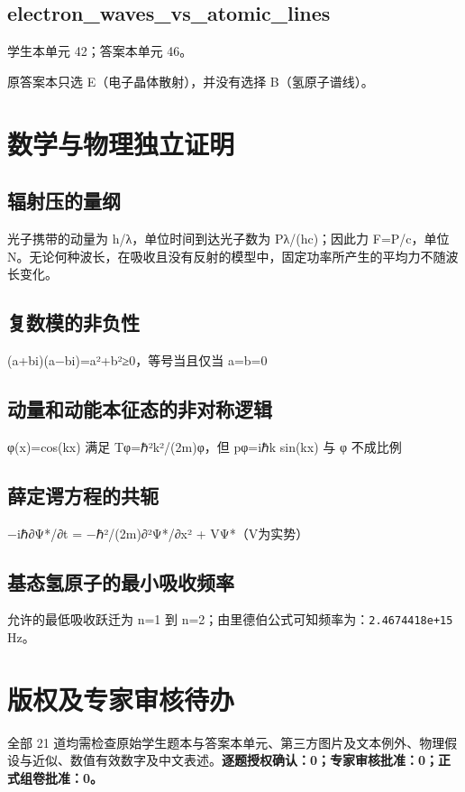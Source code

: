 \documentclass[UTF8,11pt,oneside,openany,fontset=none]{ctexbook}
\begin{document}
\section{electron\_waves\_vs\_atomic\_lines}
\noindent 学生本单元 42；答案本单元 46。\par
\noindent 原答案本只选 E（电子晶体散射），并没有选择 B（氢原子谱线）。\par
\chapter{数学与物理独立证明}
\section{辐射压的量纲}
光子携带的动量为 h/λ，单位时间到达光子数为 Pλ/(hc)；因此力 F=P/c，单位 N。无论何种波长，在吸收且没有反射的模型中，固定功率所产生的平均力不随波长变化。
\section{复数模的非负性}
(a+bi)(a−bi)=a²+b²≥0，等号当且仅当 a=b=0
\section{动量和动能本征态的非对称逻辑}
φ(x)=cos(kx) 满足 Tφ=ℏ²k²/(2m)φ，但 pφ=iℏk sin(kx) 与 φ 不成比例
\section{薛定谔方程的共轭}
−iℏ∂Ψ*/∂t = −ℏ²/(2m)∂²Ψ*/∂x² + VΨ*（V为实势）
\section{基态氢原子的最小吸收频率}
允许的最低吸收跃迁为 n=1 到 n=2；由里德伯公式可知频率为：\texttt{2.4674418e+15} Hz。
\backmatter
\chapter*{版权及专家审核待办}
全部 21 道均需检查原始学生题本与答案本单元、第三方图片及文本例外、物理假设与近似、数值有效数字及中文表述。\textbf{逐题授权确认：0；专家审核批准：0；正式组卷批准：0。}
\end{document}
